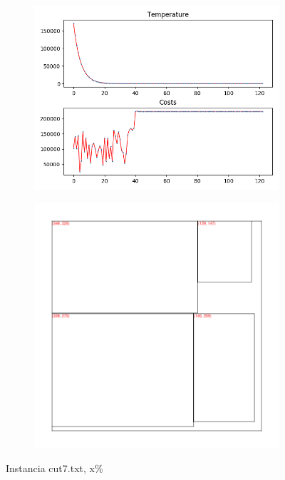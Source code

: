 \begin{figure}
\centering
\begin{subfigure}{.5\textwidth}
  \centering
  \includegraphics[width=1\linewidth]{results/cut7/1/plot}
  \label{fig:sub1}
\end{subfigure}%
\begin{subfigure}{.5\textwidth}
  \centering
  \includegraphics[width=1\linewidth]{results/cut7/1/cut}
  \label{fig:sub2}
\end{subfigure}
\caption{Instancia cut7.txt, x\%}
\label{fig:test}
\end{figure}


